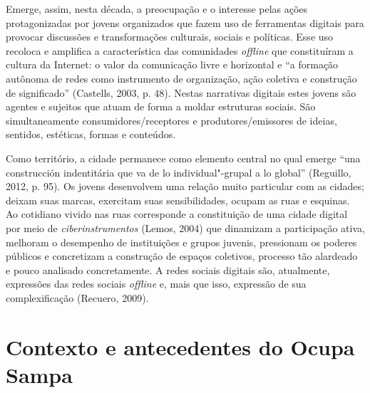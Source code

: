 Emerge, assim, nesta década, a preocupação e o interesse pelas ações
protagonizadas por jovens organizados que fazem uso de ferramentas
digitais para provocar discussões e transformações culturais, sociais e
políticas. Esse uso recoloca e amplifica a característica das
comunidades \emph{\emph{offline}} que constituíram a cultura da Internet: o
valor da comunicação livre e horizontal e ``a formação autônoma de redes
como instrumento de organização, ação coletiva e construção de
significado'' (Castells, 2003, p. 48). Nestas narrativas digitais
estes jovens são agentes e sujeitos que atuam de forma a moldar
estruturas sociais. São simultaneamente consumidores/receptores e
produtores/emissores de ideias, sentidos, estéticas, formas e conteúdos.

Como território, a cidade permanece como elemento central no qual emerge
``una construcción indentitária que va de lo individual"-grupal a lo
global'' (Reguillo, 2012, p. 95). Os jovens desenvolvem uma relação
muito particular com as cidades; deixam suas marcas, exercitam suas
sensibilidades, ocupam as ruas e esquinas. Ao cotidiano vivido nas ruas
corresponde a constituição de uma cidade digital por meio de
\emph{ciberinstrumentos} (Lemos, 2004) que dinamizam a participação
ativa, melhoram o desempenho de instituições e grupos juvenis,
pressionam os poderes públicos e concretizam a construção de espaços
coletivos, processo tão alardeado e pouco analisado concretamente. A
redes sociais digitais são, atualmente, expressões das redes sociais
\emph{\emph{offline}} e, mais que isso, expressão de sua complexificação
(Recuero, 2009).

\section{Contexto e antecedentes do Ocupa Sampa}

